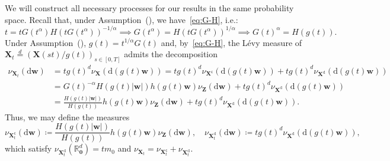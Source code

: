 \documentclass[en,oneside,bbfont,article]{amsart}
\theoremstyle{remark}
\theoremstyle{definition}
\theoremstyle{definition}
\newcommand\R{\mathbb{R}}
\newcommand\1{\mathds{1}}
\newcommand\eqd{\overset{d}{=}}
\newcommand\co{\mathsf{c}}
\newcommand{\D}{\mathrm{d}}
\begin{document}
We will construct all necessary processes for our results in the same probability space. Recall that, under Assumption~(), we have~\eqref{eq:G-H}, i.e.:
\begin{equation*}
t=tG(t^\alpha)H(tG(t^\alpha))^{-1/\alpha}
\implies
G(t^\alpha)=H(tG(t^\alpha))^{1/\alpha}
\implies 
G(t)^{\alpha}=H(g(t)).
\end{equation*}
Under Assumption~(), $g(t)=t^{1/\alpha}G(t)$ and, by~\eqref{eq:G-H}, the L\'evy measure of $\bm{X}_t\eqd (\bm{X}(st)/g(t))_{s\in[0,T]}$ admits the decomposition
\begin{equation}\label{eq:nu_Xt-decomposition_TNN}
\begin{aligned}
\nu_{\bm{X}_t}(\D\bm{w})
&=t g(t)^d\nu_{\bm{X}}(\D(g(t)\bm{w}))
=
t g(t)^d\nu_{\bm{X}^\co}(\D(g(t)\bm{w}))
+
t g(t)^d\nu_{\bm{X}^\D}(\D(g(t)\bm{w}))\\
&=
G(t)^{-\alpha} H(g(t)|\bm{w}|)h(g(t)\bm{w})\nu_{\bm{Z}}(\D\bm{w})
+t g(t)^d\nu_{\bm{X}^\D}(\D(g(t)\bm{w}))\\
&=
\frac{H(g(t)|\bm{w}|)}{H(g(t))}h(g(t)\bm{w})\nu_{\bm{Z}}(\D\bm{w})
+t g(t)^d\nu_{\bm{X}^\D}(\D(g(t)\bm{w})).
\end{aligned}
\end{equation}
Thus, we may define the measures 
\[
\nu_{\bm{X}^\co_t}(\D\bm{w})
\coloneqq\frac{H(g(t)|\bm{w}|)}{H(g(t))}h(g(t)\bm{w})\nu_{\bm{Z}}(\D\bm{w}),
\quad 
\nu_{\bm{X}^\D_t}(\D\bm{w})
\coloneqq
t g(t)^d\nu_{\bm{X}^\D}(\D(g(t)\bm{w})),
\]
which satisfy $\nu_{\bm{X}^\D_t}(\R^d_{\bm0})=tm_0$ and $\nu_{\bm{X}_t}=\nu_{\bm{X}_t^\co}+\nu_{\bm{X}_t^\D}$. 
\end{document}
